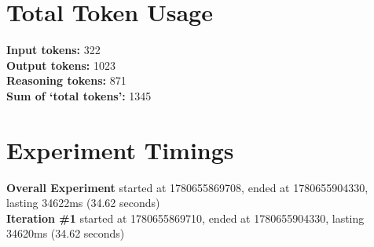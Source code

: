 \documentclass{article}
\begin{document}
\section*{Total Token Usage}
\textbf{Input tokens: }322
\\\textbf{Output tokens: }1023
\\\textbf{Reasoning tokens: }871
\\\textbf{Sum of `total tokens': }1345
\section*{Experiment Timings}
\textbf{Overall Experiment} started at 1780655869708, ended at 1780655904330, lasting 34622ms (34.62 seconds)
\\\textbf{Iteration \#1} started at 1780655869710, ended at 1780655904330, lasting 34620ms (34.62 seconds)
\end{document}
